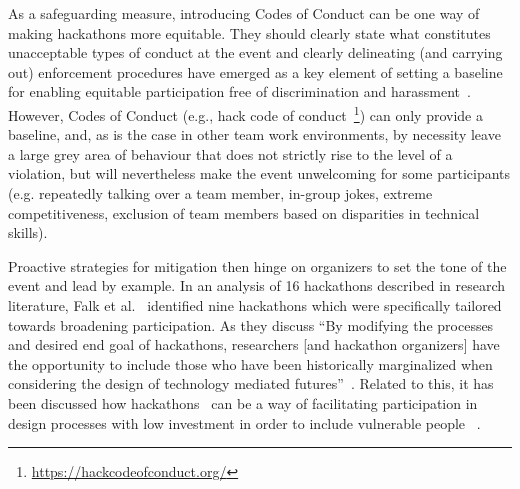 \documentclass{ieeeaccess}
\begin{document}
As a safeguarding measure, introducing Codes of Conduct can be one way of making hackathons more equitable.
They should clearly state what constitutes unacceptable types of conduct at the event and clearly delineating (and carrying out) enforcement procedures have emerged as a key element of setting a baseline for enabling equitable participation free of discrimination and harassment~\cite{prado2021trans}. 
However, Codes of Conduct (e.g., hack code of conduct~\footnote{\href{https://hackcodeofconduct.org/}{https://hackcodeofconduct.org/}}) can only provide a baseline, and, as is the case in other team work environments, by necessity leave a large grey area of behaviour that does not strictly rise to the level of a violation, but will nevertheless make the event unwelcoming for some participants (e.g. repeatedly talking over a team member, in-group jokes, extreme competitiveness, exclusion of team members based on disparities in technical skills). 

Proactive strategies for mitigation then hinge on organizers to set the tone of the event and lead by example. 
In an analysis of 16 hackathons described in research literature, Falk et al.~\cite{falk2021hackathons} identified nine hackathons which were specifically tailored towards broadening participation.
As they discuss ``By modifying the processes and desired end goal of hackathons, researchers [and hackathon organizers] have the opportunity to include those who have been historically marginalized when considering the design of technology mediated futures''~\cite{falk2021hackathons}. 
Related to this, it has been discussed how hackathons~\cite{falk2022shortening} can be a way of facilitating participation in design processes with low investment in order to include vulnerable people ~\cite{kanstrup2018participatory}.
\end{document}
